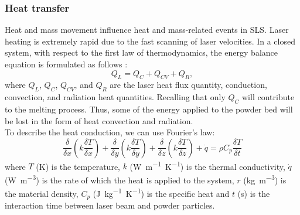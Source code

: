 \subsubsection{Heat transfer}
\label{sssec:heattransfer}
Heat and mass movement influence heat and mass-related events in SLS. Laser heating is extremely rapid due to the fast scanning of laser velocities. In a closed system, with respect to the first law of thermodynamics, the energy balance equation is formulated as follows \cite{bouabbou_understanding_2022}:
\begin{equation}
    \label{eq:tutteQ}
    Q_L = Q_C + Q_{CV} + Q_R,
\end{equation}
where $Q_L$, $Q_C$, $Q_{CV}$, and $Q_R$ are the laser heat flux quantity, conduction, convection, and radiation heat quantities. Recalling that only $Q_C$ will contribute to the melting process. Thus, some of the energy applied to the powder bed will be lost in the form of heat convection and radiation. \\
To describe the heat conduction, we can use Fourier's law:
\begin{equation}
    \label{eq:nonsiecapitouncazzo}
    \frac{\delta}{\delta x}\left(k \frac{\delta T}{\delta x}\right)+\frac{\delta}{\delta y}\left(k \frac{\delta T}{\delta y}\right)+\frac{\delta}{\delta z}\left(k \frac{\delta T}{\delta z}\right)+\dot{q} =\rho C_p \frac{\delta T}{\delta t}
\end{equation}
where $T$ (\unit{\kelvin}) is the temperature, $k$ (\unit{\watt.\metre^{-1}.\kelvin^{-1}}) is the thermal conductivity, $\dot{q}$ (\unit{\watt.\metre^{-3}}) is the rate of which the heat is applied to the system, $r$ (\unit{\kilo\gram.\metre^{-3}}) is the material density, $C_p$ (\unit{\joule. \kilo\gram^{-1}.\kelvin^{-1}}) is the specific heat and $t$ (\unit{\second}) is the interaction time between laser beam and powder particles.

